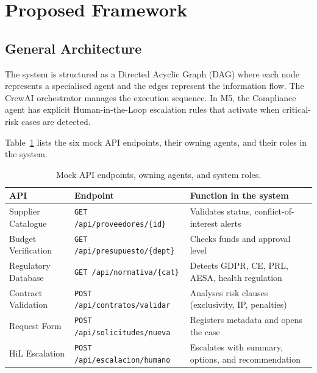 \documentclass[preprint,12pt,authoryear]{elsarticle}
\begin{document}
\section{Proposed Framework}
\label{sec:framework}

\subsection{General Architecture}

The system is structured as a Directed Acyclic Graph (DAG) where each node
represents a specialised agent and the edges represent the information flow.
The CrewAI orchestrator manages the execution sequence.
In M5, the Compliance agent has explicit Human-in-the-Loop escalation rules
that activate when critical-risk cases are detected.

Table~\ref{tab:apis} lists the six mock API endpoints, their owning agents, and
their roles in the system.

\begin{table}[htbp]
\centering
\caption{Mock API endpoints, owning agents, and system roles.}
\label{tab:apis}
\begin{tabularx}{\textwidth}{llX}
\toprule
\textbf{API} & \textbf{Endpoint} & \textbf{Function in the system} \\
\midrule
Supplier Catalogue &
  \texttt{GET /api/proveedores/\{id\}} &
  Validates status, conflict-of-interest alerts \\
Budget Verification &
  \texttt{GET /api/presupuesto/\{dept\}} &
  Checks funds and approval level \\
Regulatory Database &
  \texttt{GET /api/normativa/\{cat\}} &
  Detects GDPR, CE, PRL, AESA, health regulation \\
Contract Validation &
  \texttt{POST /api/contratos/validar} &
  Analyses risk clauses (exclusivity, IP, penalties) \\
Request Form &
  \texttt{POST /api/solicitudes/nueva} &
  Registers metadata and opens the case \\
HiL Escalation &
  \texttt{POST /api/escalacion/humano} &
  Escalates with summary, options, and recommendation \\
\bottomrule
\end{tabularx}
\end{table}
\end{document}
